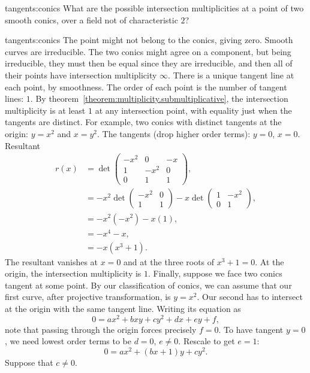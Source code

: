 \begin{problem}{tangents:conics}
What are the possible intersection multiplicities at a point of two smooth conics, over a field not of characteristic \(2\)?
\end{problem}
\begin{answer}{tangents:conics}
The point might not belong to the conics, giving zero.
Smooth curves are irreducible.
The two conics might agree on a component, but being irreducible, they must then be equal since they are irreducible, and then all of their points have intersection multiplicity \(\infty\).
There is a unique tangent line at each point, by smoothness.
The order of each point is the number of tangent lines: \(1\).
By theorem~\vref{theorem:multiplicity.submultiplicative}, the intersection multiplicity is at least \(1\) at any intersection point, with equality just when the tangents are distinct.
For example, two conics with distinct tangents at the origin: \(y=x^2\) and \(x=y^2\).
The tangents (drop higher order terms): \(y=0\), \(x=0\). 
Resultant
\begin{align*}
r(x)
&=
\det
\begin{pmatrix}
-x^2&0&-x\\
1&-x^2&0\\
0&1&1
\end{pmatrix},
\\
&=
-x^2
\det
\begin{pmatrix}
-x^2&0\\
1&1
\end{pmatrix}
-x
\det
\begin{pmatrix}
1&-x^2\\
0&1
\end{pmatrix},
\\
&=
-x^2(-x^2)-x(1),
\\
&=
-x^4-x,
\\
&=-x(x^3+1).
\end{align*}
The resultant vanishes at \(x=0\) and at the three roots of \(x^3+1=0\).
At the origin, the intersection multiplicity is \(1\).
Finally, suppose we face two conics tangent at some point.
By our classification of conics, we can assume that our first curve, after projective transformation, is \(y=x^2\).
Our second has to intersect at the origin with the same tangent line.
Writing its equation as
\[
0=ax^2+bxy+cy^2+dx+ey+f,
\]
note that passing through the origin forces precisely \(f=0\).
To have tangent \(y=0\), we need lowest order terms to be \(d=0\), \(e\ne 0\).
Rescale to get \(e=1\):
\[
0=ax^2+(bx+1)y+cy^2.
\]
Suppose that \(c\ne 0\).

\end{answer}
